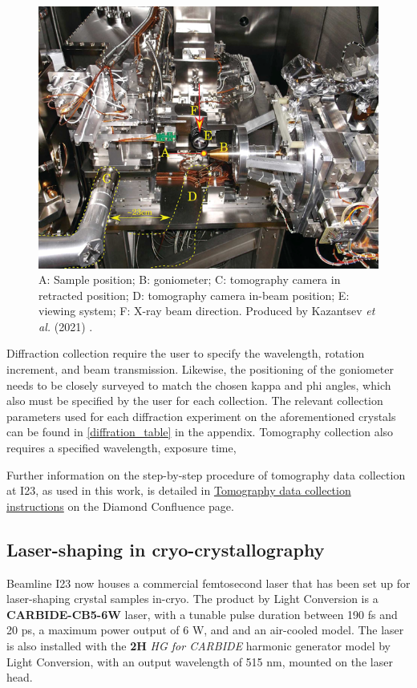 \begin{figure}
    \centering
    \includegraphics{images/tomo camera.png}
    \caption{A: Sample position; B: goniometer; C: tomography camera in retracted position; D: tomography camera in-beam position; E: viewing system; F: X-ray beam direction. Produced by Kazantsev \textit{et al.} (2021) \cite{Kazantsev2021}.}
    \label{fig:vacuum_chamber}
\end{figure}

Diffraction collection require the user to specify the wavelength, rotation increment, and beam transmission. Likewise, the positioning of the goniometer needs to be closely surveyed to match the chosen kappa and phi angles, which also must be specified by the user for each collection. The relevant collection parameters used for each diffraction experiment on the aforementioned crystals can be found in \cref{diffration_table} in the appendix. Tomography collection also requires a specified wavelength, exposure time, 

Further information on the step-by-step procedure of tomography data collection at I23, as used in this work, is detailed in \href{https://confluence.diamond.ac.uk/x/h4HVDQ}{Tomography data collection instructions} on the Diamond Confluence page.

\subsection{Laser-shaping in cryo-crystallography}
Beamline I23 now houses a commercial femtosecond laser  that has been set up for laser-shaping crystal samples in-cryo. The product by Light Conversion is a \textbf{CARBIDE-CB5-6W} laser, with a tunable pulse duration between 190 \unit{fs} and 20 \unit{ps}, a maximum power output of 6 \unit{W}, and and an air-cooled model. The laser is also installed with the \textbf{2H} \textit{HG for CARBIDE} harmonic generator model by Light Conversion, with an output wavelength of 515 \unit{nm}, mounted on the laser head.

